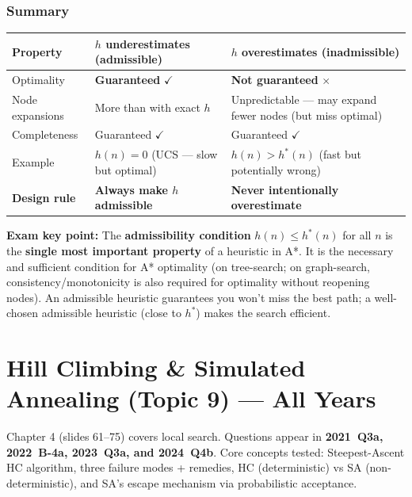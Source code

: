 \documentclass[12pt, a4paper]{article}
\newenvironment{notesbox}{\begin{mdframed}[style=notesframe]}{\end{mdframed}}
\begin{document}
\subsubsection*{Summary}

\begin{center}
\renewcommand{\arraystretch}{1.5}
\begin{tabular}{l|l|l}
\toprule
\textbf{Property} & \textbf{$h$ underestimates (admissible)} & \textbf{$h$ overestimates (inadmissible)} \\
\midrule
Optimality & \textbf{Guaranteed} $\checkmark$ & \textbf{Not guaranteed} $\times$ \\
Node expansions & More than with exact $h$ & Unpredictable — may expand fewer nodes (but miss optimal) \\
Completeness & Guaranteed $\checkmark$ & Guaranteed $\checkmark$ \\
Example & $h(n)=0$ (UCS — slow but optimal) & $h(n) > h^*(n)$ (fast but potentially wrong) \\
\midrule
\textbf{Design rule} & \textbf{Always make $h$ admissible} & \textbf{Never intentionally overestimate} \\
\bottomrule
\end{tabular}
\end{center}

\begin{notesbox}
\textbf{Exam key point:} The \textbf{admissibility condition} $h(n) \leq h^*(n)$ for all $n$ is the \textbf{single most important property} of a heuristic in A*. It is the necessary and sufficient condition for A* optimality (on tree-search; on graph-search, consistency/monotonicity is also required for optimality without reopening nodes). An admissible heuristic guarantees you won't miss the best path; a well-chosen admissible heuristic (close to $h^*$) makes the search efficient.
\end{notesbox}

\newpage
\section{Hill Climbing \& Simulated Annealing (Topic 9) — All Years}

\noindent Chapter 4 (slides 61--75) covers local search. Questions appear in \textbf{2021~Q3a, 2022~B-4a, 2023~Q3a, and 2024~Q4b}. Core concepts tested: Steepest-Ascent HC algorithm, three failure modes + remedies, HC (deterministic) vs SA (non-deterministic), and SA's escape mechanism via probabilistic acceptance.
\end{document}
